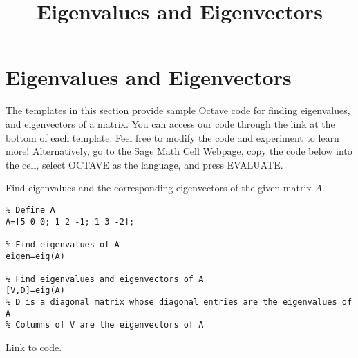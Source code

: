 \documentclass{ximera}
\title{Eigenvalues and Eigenvectors} \license{CC BY-NC-SA 4.0}
\begin{document}
\begin{abstract}
\end{abstract}
\maketitle
\section*{Eigenvalues and Eigenvectors}

The templates in this section provide sample Octave code for finding eigenvalues, and eigenvectors of a matrix.  You can access our code through the link at the bottom of each template.  Feel free to modify the code and experiment to learn more!  Alternatively, go to the \href{https://sagecell.sagemath.org/}{Sage Math Cell Webpage}, copy the code below into the cell, select OCTAVE as the language, and press EVALUATE.  

\begin{template}\label{temp:eigen}
Find eigenvalues and the corresponding eigenvectors of the given matrix $A$.

\begin{verbatim}
% Define A
A=[5 0 0; 1 2 -1; 1 3 -2];

% Find eigenvalues of A
eigen=eig(A)

% Find eigenvalues and eigenvectors of A
[V,D]=eig(A)
% D is a diagonal matrix whose diagonal entries are the eigenvalues of A
% Columns of V are the eigenvectors of A 
\end{verbatim}

\href{https://sagecell.sagemath.org/?z=eJx1jkELgkAUhO8L_oe5LBQkqNFJPCxJP8GLeFjyqQ90F9a1-vmpkEXU5Q0zzPcYiZwaNgQVCJWVJ0SIUsRIEMaLHhEmVRqIQEhc2NQgbsncdD_RCNss2Jpk892p_Z-i3jxdvXUvsiwOebWREjl47qJm3VqjewzaO37g3tmR3imZOV2eOoLv6MciibPtp8Gsvvgqfix4AsFaTeY=&lang=octave&interacts=eJyLjgUAARUAuQ==}{Link to code}.
\end{template}
\end{document}
